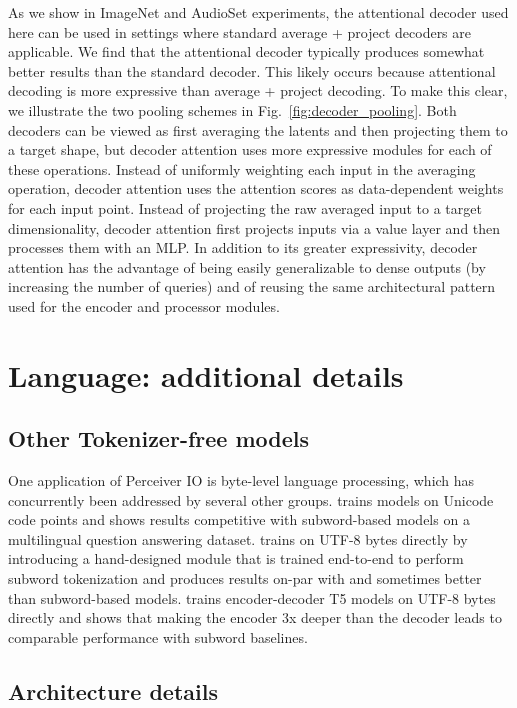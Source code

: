 \documentclass{article} %
\newcommand{\ourmodel}{Perceiver IO\xspace}
\begin{document}
As we show in ImageNet and AudioSet experiments, the attentional decoder used here can be used in settings where standard average + project decoders are applicable. We find that the attentional decoder typically produces somewhat better results than the standard decoder. This likely occurs because attentional decoding is more expressive than average + project decoding. To make this clear, we illustrate the two pooling schemes in Fig.~\ref{fig:decoder_pooling}. Both decoders can be viewed as first averaging the latents and then projecting them to a target shape, but decoder attention uses more expressive modules for each of these operations. Instead of uniformly weighting each input in the averaging operation, decoder attention uses the attention scores as data-dependent weights for each input point. Instead of projecting the raw averaged input to a target dimensionality, decoder attention first projects inputs via a value layer and then processes them with an MLP. In addition to its greater expressivity, decoder attention has the advantage of being easily generalizable to dense outputs (by increasing the number of queries) and of reusing the same architectural pattern used for the encoder and processor modules.

\section{Language: additional details}

\subsection{Other Tokenizer-free models}
One application of \ourmodel{} is byte-level language processing, which has concurrently been addressed by several other groups. \cite{clark2021canine} trains models on Unicode code points and shows results competitive with subword-based models on a multilingual question answering dataset. \cite{tay2021charformer} trains on UTF-8 bytes directly by introducing a hand-designed module that is trained end-to-end to perform subword tokenization and produces results on-par with and sometimes better than subword-based models. \cite{xue2021byt5} trains encoder-decoder T5 models on UTF-8 bytes directly and shows that making the encoder 3x deeper than the decoder leads to comparable performance with subword baselines.

\subsection{Architecture details}
\label{ref:language_arch_appendix}
\end{document}
